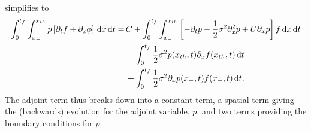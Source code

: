   simplifies to 
\begin{align*}
\int_0^{{ t_f }} \int_{x_-}^{{ x_{th} }}
p  \left[{\partial}_t f  + {\partial}_x \phi\right]
	\, \mathrm{d} x\, \mathrm{d} t 
= & \, C+
\int_0^{{ t_f }}\int_{x_-}^{{ x_{th} }} 
	\left[-{\partial}_tp -  \frac{1 }{2}\sigma^2{\partial}^2_xp + U {\partial}_xp \right]  f
\, \mathrm{d} x\, \mathrm{d} t
\\ 
& \, - \int_{0}^{{ t_f }} \frac{1 }{2}\sigma^2 p({ x_{th} },t)  {\partial}_xf({ x_{th} },t) \, \mathrm{d} t
\\
& \, + \int_{0}^{{ t_f }} \frac{1 }{2}\sigma^2{\partial}_xp(x_-,t)  f(x_-,t) \, \mathrm{d} t.
\end{align*}
The adjoint term thus breaks down into a constant term, a spatial
term giving the (backwards) evolution for the adjoint variable, $p$,
and two terms providing the boundary conditions for $p$. 

